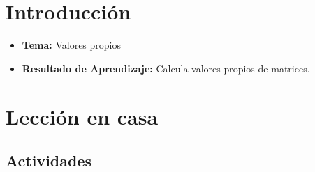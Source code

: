 \documentclass[a4,11pt]{aleph-notas}
\begin{document}
\encabezado

\vspace*{-10mm}
\section*{Introducción}

\begin{itemize}
    \item \textbf{Tema:} Valores propios
    \item \textbf{Resultado de Aprendizaje:} Calcula valores propios de matrices.
\end{itemize}

\section*{Lección en casa}

\subsection*{Actividades}
\end{document}
